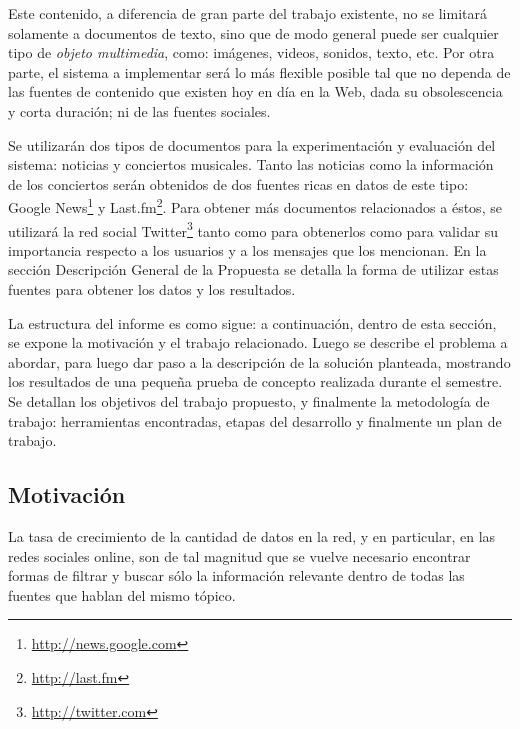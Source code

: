 \documentclass[11pt,letterpaper]{article}
\begin{document}
  Este contenido, a diferencia de gran parte del trabajo existente, no
  se limitará solamente a documentos de texto, sino que de modo general puede ser cualquier
  tipo de \emph{objeto multimedia}, como: imágenes, videos, sonidos, texto,
  etc. Por otra parte, el sistema a implementar será lo más flexible
  posible tal que no dependa de las fuentes de contenido que existen hoy
  en día en la Web, dada su obsolescencia y corta duración; ni de las
  fuentes sociales.

  Se utilizarán dos tipos de documentos para la experimentación y
  evaluación del sistema: noticias y conciertos musicales. Tanto las
  noticias como la información de los conciertos serán obtenidos de dos
  fuentes ricas en datos de este tipo: Google
  News\footnote{\href{http://news.google.com}{http://news.google.com} } y Last.fm\footnote{\href{http://last.fm}{http://last.fm} }. Para
  obtener más documentos relacionados a éstos, se utilizará la red
  social Twitter\footnote{\href{http://twitter.com}{http://twitter.com} } tanto como para obtenerlos como para validar su
  importancia respecto a los usuarios y a los mensajes que los
  mencionan. En la sección Descripción General de la Propuesta se
  detalla la forma de utilizar estas fuentes para obtener los datos y
  los resultados. 

  La estructura del informe es como sigue: a continuación, dentro de
  esta sección, se expone la motivación y el trabajo
  relacionado. Luego se describe el problema a abordar, para luego dar
  paso a la descripción de la solución planteada, mostrando los
  resultados de una pequeña prueba de concepto realizada durante el
  semestre. Se detallan los objetivos del trabajo propuesto, y
  finalmente la metodología de trabajo: herramientas encontradas,
  etapas del desarrollo y finalmente un plan de trabajo.

\subsection{Motivación}
\label{sec-1.1}


   La tasa de crecimiento de la cantidad de datos en la red, y en
   particular, en las redes sociales online, son de tal magnitud que
   se vuelve necesario encontrar formas de filtrar y buscar sólo la
   información relevante dentro de todas las fuentes que hablan del
   mismo tópico. 
   
\end{document}
